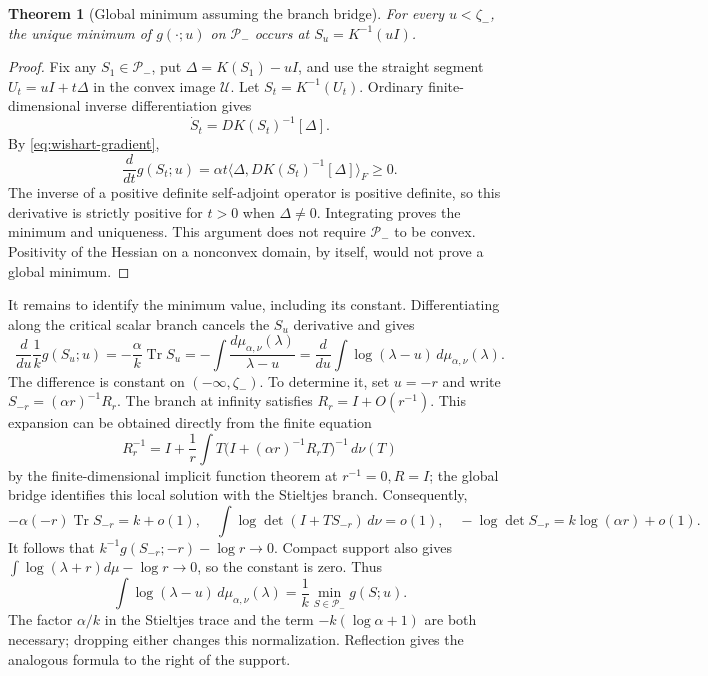 \documentclass[11pt,a4paper]{article}
\newtheorem{theorem}{Theorem}[section]
\begin{document}
\begin{theorem}[Global minimum assuming the branch bridge]
For every \(u<\zeta_-\), the unique minimum of \(g(\cdot;u)\) on
\(\mathcal P_-\) occurs at \(S_u=K^{-1}(uI)\).
\end{theorem}
\begin{proof}
Fix any \(S_1\in\mathcal P_-\), put \(\Delta=K(S_1)-uI\), and use the
straight segment \(U_t=uI+t\Delta\) in the convex image \(\mathcal U\).
Let \(S_t=K^{-1}(U_t)\).  Ordinary finite-dimensional inverse differentiation
gives
\[
 \dot S_t=DK(S_t)^{-1}[\Delta].
\]
By \eqref{eq:wishart-gradient},
\[
 \frac d{dt}g(S_t;u)
  =\alpha t\langle\Delta,DK(S_t)^{-1}[\Delta]\rangle_F\geq0.
\]
The inverse of a positive definite self-adjoint operator is positive
definite, so this derivative is strictly positive for \(t>0\) when
\(\Delta\neq0\).  Integrating proves the minimum and uniqueness.
This argument does not require \(\mathcal P_-\) to be convex.  Positivity
of the Hessian on a nonconvex domain, by itself, would not prove a global
minimum.
\end{proof}

It remains to identify the minimum value, including its constant.
Differentiating along the critical scalar branch cancels the \(S_u\)
derivative and gives
\[
 \frac d{du}\frac1k g(S_u;u)
  =-\frac\alpha k\operatorname{Tr}S_u
  =-\int\frac{d\mu_{\alpha,\nu}(\lambda)}{\lambda-u}
  =\frac d{du}\int\log(\lambda-u)\,d\mu_{\alpha,\nu}(\lambda).
\]
The difference is constant on \(( -\infty,\zeta_-)\).
To determine it, set \(u=-r\) and write
\(S_{-r}=(\alpha r)^{-1}R_r\).  The branch at infinity satisfies
\(R_r=I+O(r^{-1})\).  This expansion can be obtained directly from the
finite equation
\[
 R_r^{-1}=I+\frac1r\int
 T\bigl(I+(\alpha r)^{-1}R_rT\bigr)^{-1}\,d\nu(T)
\]
by the finite-dimensional implicit function theorem at \(r^{-1}=0,R=I\);
the global bridge identifies this local solution with the Stieltjes branch.
Consequently,
\[
 -\alpha(-r)\operatorname{Tr}S_{-r}=k+o(1),\quad
 \int\log\det(I+TS_{-r})\,d\nu=o(1),\quad
 -\log\det S_{-r}=k\log(\alpha r)+o(1).
\]
It follows that \(k^{-1}g(S_{-r};-r)-\log r\to0\).
Compact support also gives
\(\int\log(\lambda+r)d\mu-\log r\to0\), so the constant is zero.  Thus
\[
 \int\log(\lambda-u)\,d\mu_{\alpha,\nu}(\lambda)
   =\frac1k\min_{S\in\mathcal P_-}g(S;u).
\]
The factor \(\alpha/k\) in the Stieltjes trace and the term
\(-k(\log\alpha+1)\) are both necessary; dropping either changes this
normalization.  Reflection gives the analogous formula to the right of
the support.
\end{document}
